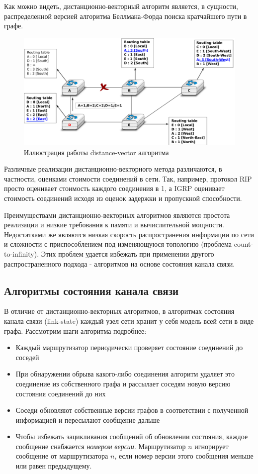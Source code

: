 \documentclass[specification, annotation]{itmo-student-thesis}
\begin{document}
Как можно видеть, дистанционно-векторный алгоритм является, в сущности,
распределенной версией алгоритма Беллмана-Форда поиска кратчайшего пути в
графе\cite{bellman-ford}.

\begin{figure}[!h]
  \caption{Иллюстрация работы distance-vector алгоритма}\label{rip-img}
  \centering
  \includegraphics[scale=1.5]{dv-failure-2}
\end{figure}

Различные реализации дистанционно-векторного метода различаются, в частности,
оценками стоимости соединений в сети. Так, например, протокол RIP\cite{rip-rfc} просто
оценивает стоимость каждого соединения в 1, а IGRP\cite{igrp-patent} оценивает
стоимость соединений исходя из оценок задержки и пропускной способности.

Преимуществами дистанционно-векторных алгоритмов являются простота реализации и
низкие требования к памяти и вычислительной мощности. Недостатками же являются
низкая скорость распространения информации по сети и сложности с приспособлением
под изменяющуюся топологию (проблема count-to-infinity). Этих проблем
удается избежать при применении другого распространенного подхода - алгоритмов
на основе состояния канала связи. 

\subsection{Алгоритмы состояния канала связи}

В отличие от дистанционно-векторных алгоритмов, в алгоритмах состояния канала связи
(link-state) каждый узел сети хранит у себя модель всей сети в виде графа.
Рассмотрим шаги алгоритма подробнее:

\begin{itemize}
\item Каждый маршрутизатор периодически проверяет состояние соединений до
  соседей
\item При обнаружении обрыва какого-либо соединения алгоритм удаляет это
  соединение из собственного графа и рассылает соседям новую версию состояния
  соединений до них
\item Соседи обновляют собственные версии графов в соответствии с полученной
  информацией и пересылают сообщение дальше
\item Чтобы избежать зацикливания сообщений об обновлении состояния, каждое
  сообщение снабжается \textit{номером версии}. Маршрутизатор $n$ игнорирует
  сообщение от маршрутизатора $n$, если номер версии этого сообщения меньше или
  равен предыдущему.
\end{itemize}
\end{document}
